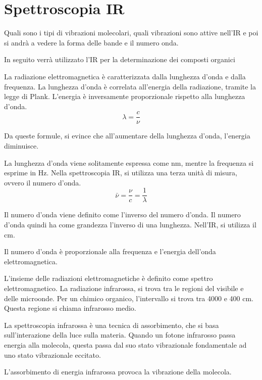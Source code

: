 \chapter{Spettroscopia IR}

Quali sono i tipi di vibrazioni molecolari, quali vibrazioni sono attive
nell'IR e poi si andrà a vedere la forma delle bande e il numero onda.

In seguito verrà utilizzato l'IR per la determinazione dei composti
organici

La radiazione elettromagnetica è caratterizzata dalla lunghezza d'onda e
dalla frequenza. La lunghezza d'onda è correlata all'energia della
radiazione, tramite la legge di Plank. L'energia è inversamente
proporzionale rispetto alla lunghezza d'onda.
\[
\lambda = \frac{c}{\nu}
\]

Da queste formule, si evince che all'aumentare della lunghezza d'onda,
l'energia diminuisce.


La lunghezza d'onda viene solitamente espressa come nm, mentre la
frequenza si esprime in Hz. Nella spettroscopia IR, si utilizza una
terza unità di misura, ovvero il numero d'onda.
\[
\bar{\nu} = \frac{\nu}{c} = \frac{1}{\lambda}
\]

Il numero d'onda viene definito come l'inverso del numero d'onda. Il
numero d'onda quindi ha come grandezza l'inverso di una lunghezza.
Nell'IR, si utilizza il cm.

Il numero d'onda è proporzionale alla frequenza e l'energia dell'onda
elettromagnetica.

L'insieme delle radiazioni elettromagnetiche è definito come spettro
elettromagnetico. La radiazione infrarossa, si trova tra le regioni del
visibile e delle microonde. Per un chimico organico, l'intervallo si
trova tra 4000 e 400 cm. Questa regione si chiama infrarosso medio.


La spettroscopia infrarossa è una tecnica di assorbimento, che si basa
sull'interazione della luce sulla materia. Quando un fotone infrarosso
passa energia alla molecola, questa passa dal suo stato vibrazionale
fondamentale ad uno stato vibrazionale eccitato.

L'assorbimento di energia infrarossa provoca la vibrazione della
molecola.


